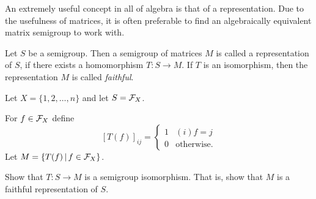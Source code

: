      An extremely useful concept in all of algebra is that of a
representation.  
Due to the usefulness of matrices, it is often preferable to find an algebraically equivalent matrix semigroup to work with.

\begin{definition}   \label{defn:2.2}
Let $S$ be a semigroup.  
Then a semigroup of matrices $M$ is called a representation of $S$, if there exists a homomorphism $T: S \to M$.  
If $T$ is an isomorphism, then the representation $M$ is called \textsl{faithful}.
\end{definition}

\begin{example}	\label{exm:2.2}
Let $X = \{1,2,\ldots,n\}$ and let $S = \mathcal{F}_X$.

For $f \in \mathcal{F}_X$ define
\[
  [T(f)]_{ij} = \begin{cases}
                    1  &(i)f = j \\
                    0  &\text{otherwise.}
                    \end{cases}
\]
Let $M = \{T(f) \,|\, f \in \mathcal{F}_X\}$.
\end{example}

Show that $T: S \to M$ is a semigroup
isomorphism.  That is, show that $M$ is a faithful representation of
$S$.

